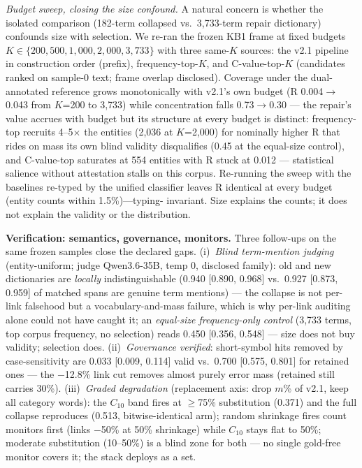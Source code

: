\documentclass[sigconf,nonacm,anonymous]{acmart}
\begin{document}
\emph{Budget sweep, closing the size confound.}
A natural concern is
whether the isolated comparison (182-term collapsed vs.\ 3{,}733-term
repair dictionary) confounds size with selection. We re-ran the frozen
KB1 frame at fixed budgets $K \in \{200, 500, 1{,}000, 2{,}000,
3{,}733\}$ with three same-$K$ sources: the v2.1 pipeline in
construction order (prefix), frequency-top-$K$, and C-value-top-$K$
(candidates ranked on sample-0 text; frame overlap disclosed).
Coverage under the dual-annotated reference grows monotonically with
v2.1's own budget (R 0.004$\to$0.043 from $K$=200 to 3{,}733) while
concentration falls 0.73$\to$0.30 --- the repair's value accrues with
budget but its structure at every budget is distinct: frequency-top
recruits 4--5$\times$ the entities (2{,}036 at $K$=2{,}000) for
nominally higher R that rides on mass its own blind validity
disqualifies (0.45 at the equal-size control), and C-value-top
saturates at 554 entities with R stuck at 0.012 --- statistical
salience without attestation stalls on this corpus. Re-running the
sweep with the baselines re-typed by the unified classifier leaves R
identical at every budget (entity counts within 1.5\%)---typing-
invariant. Size explains the counts; it does not explain the validity
or the distribution.

\textbf{Verification: semantics, governance, monitors.}
Three follow-ups on the same frozen samples close the declared gaps.
(i)~\emph{Blind term-mention judging} (entity-uniform; judge
Qwen3.6-35B, temp 0, disclosed family):
old and new dictionaries are \emph{locally} indistinguishable (0.940
[0.890, 0.968] vs.\ 0.927 [0.873, 0.959] of matched spans are genuine
term mentions) --- the collapse is not per-link falsehood but a
vocabulary-and-mass failure, which is why per-link auditing alone could
not have caught it; an \emph{equal-size frequency-only control}
(3{,}733 terms, top corpus frequency, no selection) reads 0.450
[0.356, 0.548] --- size does not buy validity; selection does. (ii)~\emph{Governance verified}: short-symbol hits removed by
case-sensitivity are 0.033 [0.009, 0.114] valid vs.\ 0.700 [0.575,
0.801] for retained ones --- the $-$12.8\% link cut removes almost
purely error mass (retained still carries 30\%). (iii)~\emph{Graded
degradation} (replacement axis: drop $m$\% of v2.1, keep all category
words): the $C_{10}$ band fires at $\geq$75\% substitution (0.371) and the
full collapse reproduces (0.513, bitwise-identical arm); random
shrinkage fires count monitors first (links $-$50\% at 50\% shrinkage)
while $C_{10}$ stays flat to 50\%; moderate substitution (10--50\%) is a
blind zone for both --- no single gold-free monitor covers it; the stack
deploys as a set.
\end{document}
